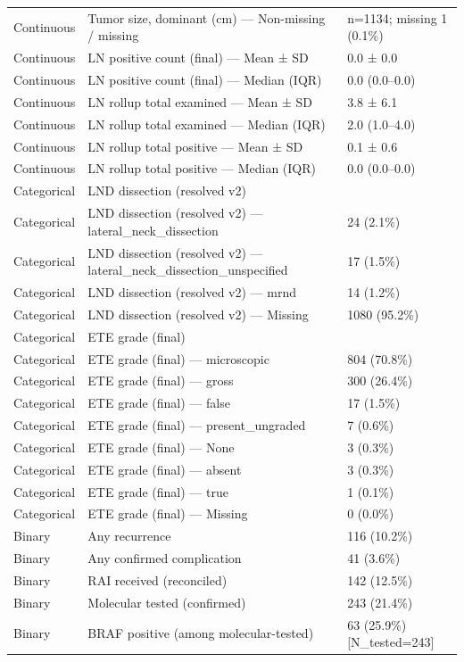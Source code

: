 \begin{table}[htbp]
\begin{tabular}{lll}
Continuous & Tumor size, dominant (cm) — Non-missing / missing & n=1134; missing 1 (0.1\%) \\
Continuous & LN positive count (final) — Mean ± SD & 0.0 ± 0.0 \\
Continuous & LN positive count (final) — Median (IQR) & 0.0 (0.0–0.0) \\
Continuous & LN rollup total examined — Mean ± SD & 3.8 ± 6.1 \\
Continuous & LN rollup total examined — Median (IQR) & 2.0 (1.0–4.0) \\
Continuous & LN rollup total positive — Mean ± SD & 0.1 ± 0.6 \\
Continuous & LN rollup total positive — Median (IQR) & 0.0 (0.0–0.0) \\
Categorical & LND dissection (resolved v2) &  \\
Categorical & LND dissection (resolved v2) — lateral\_neck\_dissection & 24 (2.1\%) \\
Categorical & LND dissection (resolved v2) — lateral\_neck\_dissection\_unspecified & 17 (1.5\%) \\
Categorical & LND dissection (resolved v2) — mrnd & 14 (1.2\%) \\
Categorical & LND dissection (resolved v2) — Missing & 1080 (95.2\%) \\
Categorical & ETE grade (final) &  \\
Categorical & ETE grade (final) — microscopic & 804 (70.8\%) \\
Categorical & ETE grade (final) — gross & 300 (26.4\%) \\
Categorical & ETE grade (final) — false & 17 (1.5\%) \\
Categorical & ETE grade (final) — present\_ungraded & 7 (0.6\%) \\
Categorical & ETE grade (final) — None & 3 (0.3\%) \\
Categorical & ETE grade (final) — absent & 3 (0.3\%) \\
Categorical & ETE grade (final) — true & 1 (0.1\%) \\
Categorical & ETE grade (final) — Missing & 0 (0.0\%) \\
Binary & Any recurrence & 116 (10.2\%) \\
Binary & Any confirmed complication & 41 (3.6\%) \\
Binary & RAI received (reconciled) & 142 (12.5\%) \\
Binary & Molecular tested (confirmed) & 243 (21.4\%) \\
Binary & BRAF positive (among molecular-tested) & 63 (25.9\%) [N\_tested=243] \\

\end{tabular}
\end{table}
